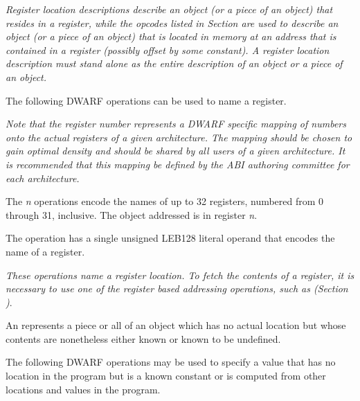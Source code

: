 \textit{Register location descriptions describe an object
(or a piece of an object) that resides in a register, while
the opcodes listed in 
Section 
are used to describe an object (or a piece of
an object) that is located in memory at an address that is
contained in a register (possibly offset by some constant). A
register location description must stand alone as the entire
description of an object or a piece of an object.
}

The following DWARF operations can be used to name a register.


\textit{Note that the register number represents a DWARF specific
mapping of numbers onto the actual registers of a given
architecture. The mapping should be chosen to gain optimal
density and should be shared by all users of a given
architecture. It is recommended that this mapping be defined
by the ABI authoring committee for each architecture.
}
\begin{enumerate}[1. ]
The \textit{n} operations encode the names of up to 32
registers, numbered from 0 through 31, inclusive. The object
addressed is in register \textit{n}.

The  operation has a single unsigned LEB128 literal
operand that encodes the name of a register.  

\end{enumerate}

\textit{These operations name a register location. To
fetch the contents of a register, it is necessary to use
one of the register based addressing operations, such as
(Section )}.

An 
represents a piece or all
of an object which has no actual location but whose contents
are nonetheless either known or known to be undefined.

The following DWARF operations may be used to specify a value
that has no location in the program but is a known constant
or is computed from other locations and values in the program.

